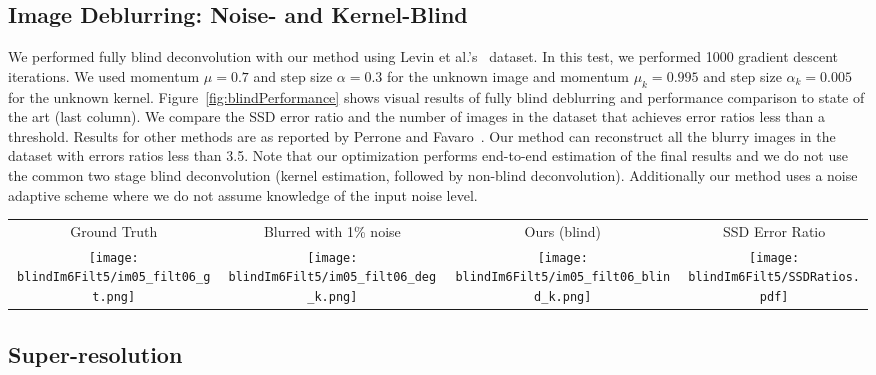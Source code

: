 \documentclass{article}
\begin{document}
\subsection{Image Deblurring: Noise- and Kernel-Blind}
We performed fully blind deconvolution with our method using Levin et al.'s~\cite{levin2007image} dataset.
In this test, we performed 1000 gradient descent iterations.
We used momentum $\mu=0.7$ and step size $\alpha = 0.3$ for the unknown image and momentum $\mu_k=0.995$ and step size $\alpha_k = 0.005$ for the unknown kernel.
Figure~\ref{fig:blindPerformance} shows visual results of fully blind deblurring and performance comparison to state of the art (last column).
We compare the SSD error ratio and the number of images in the dataset that achieves error ratios less than a threshold.
Results for other methods are as reported by Perrone and Favaro~\cite{perrone2016logarithmic}.
Our method can reconstruct all the blurry images in the dataset with errors ratios less than 3.5.
Note that our optimization performs end-to-end estimation of the final results and we do not use the common two stage blind deconvolution (kernel estimation, followed by non-blind deconvolution).
Additionally our method uses a noise adaptive scheme where we do not assume knowledge of the input noise level.

\begin{figure*}[t]
\centering
\bgroup
\setlength{\tabcolsep}{2pt}
\begin{tabular}{cccc}
Ground Truth & Blurred with 1\% noise & Ours (blind) & SSD Error Ratio \\
\texttt{[image: blindIm6Filt5/im05\_filt06\_gt.png]} &
\texttt{[image: blindIm6Filt5/im05\_filt06\_deg\_k.png]} &
\texttt{[image: blindIm6Filt5/im05\_filt06\_blind\_k.png]} &
\texttt{[image: blindIm6Filt5/SSDRatios.pdf]} 
\end{tabular}
\egroup
\caption{
Performance of our method for fully (noise- and kernel-) blind deblurring on Levin's set.
}
\label{fig:blindPerformance}
\end{figure*}


\subsection{Super-resolution}
\end{document}
